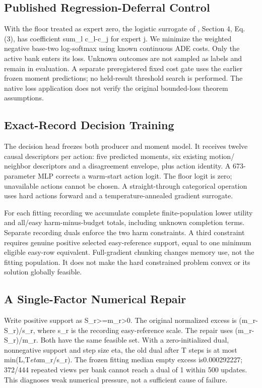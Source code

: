 \documentclass[10pt,twocolumn,letterpaper]{article}
\begin{document}
\subsection{Published Regression-Deferral Control}
With the floor treated as expert zero, the logistic surrogate of \cite{ref3}, Section 4,
Eq. (3), has coefficient sum\_l c\_l-c\_j for expert j. We minimize the weighted
negative base-two log-softmax using known continuous ADE costs. Only the active
bank enters its loss. Unknown outcomes are not sampled as labels and remain
in evaluation. A separate preregistered fixed cost gate uses the earlier frozen
moment predictions; no held-result threshold search is performed. The native
loss application does not verify the original bounded-loss theorem assumptions.

\subsection{Exact-Record Decision Training}
The decision head freezes both producer and moment model. It receives twelve
causal descriptors per action: five predicted moments, six existing motion/
neighbor descriptors and a disagreement envelope, plus action identity. A
673-parameter MLP corrects a warm-start action logit. The floor logit is zero;
unavailable actions cannot be chosen. A straight-through categorical operation
uses hard actions forward and a temperature-annealed gradient surrogate.

For each fitting recording we accumulate complete finite-population lower
utility and all/easy harm-minus-budget totals, including unknown completion
terms. Separate recording duals enforce the two harm constraints. A third
constraint requires genuine positive selected easy-reference support, equal
to one minimum eligible easy-row equivalent. Full-gradient chunking changes
memory use, not the fitting population. It does not make the hard constrained
problem convex or its solution globally feasible.

\subsection{A Single-Factor Numerical Repair}
Write positive support as S\_r\textgreater{}=m\_r\textgreater{}0. The original normalized excess is
(m\_r-S\_r)/s\_r, where s\_r is the recording easy-reference scale. The repair uses
(m\_r-S\_r)/m\_r. Both have the same feasible set. With a zero-initialized dual,
nonnegative support and step size eta, the old dual after T steps is at most
min(L,T\emph{eta}m\_r/s\_r). The frozen fitting median empty excess is0.000292227;
372/444 repeated views per bank cannot reach a dual of 1 within 500 updates.
This diagnoses weak numerical pressure, not a sufficient cause of failure.
\end{document}
